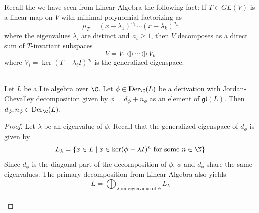 \documentclass[a4paper]{article}
\begin{document}
Recall the we have seen from Linear Algebra the following fact: If $T\in GL(V)$ is a linear map on $V$ with minimal polynomial factorizing as $$\mu_T=(x-\lambda_1)^{a_1}\cdots(x-\lambda_k)^{a_k}$$ where the eigenvalues $\lambda_i$ are distinct and $a_i\geq 1$, then $V$ decomposes as a direct sum of $T$-invariant subspaces $$V=V_1\oplus\cdots\oplus V_k$$ where $V_i=\ker(T-\lambda_i I)^{a_i}$ is the generalized eigenspace. 

\begin{lmm}{}{} \\Let $L$ be a Lie algebra over $\C$. Let $\phi\in\text{Der}_\C(L)$ be a derivation with Jordan-Chevalley decomposition given by $\phi=d_\phi+n_\phi$ as an element of $\mathfrak{gl}(L)$. Then $d_\phi,n_\phi\in\text{Der}_\C(L)$. 
\begin{proof}
Let $\lambda$ be an eigenvalue of $\phi$. Recall that the generalized eigenspace of $d_\phi$ is given by $$L_\lambda=\{x\in L\;|\;x\in\ker(\phi-\lambda I)^n\text{ for some }n\in\N\}$$ Since $d_\phi$ is the diagonal part of the decomposition of $\phi$, $\phi$ and $d_\phi$ share the same eigenvalues. The primary decomposition from Linear Algebra also yields $$L=\bigoplus_{\lambda\text{ an eigenvalue of }\phi}L_\lambda$$~\\


\end{proof}
\end{lmm}
\end{document}
